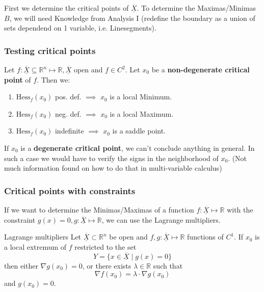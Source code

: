 \documentclass[a4paper,fontsize = 10pt]{article}
\def\R{\mathbb{R}}
\def\X{\underline{\overline{X}}}
\begin{document}
First we determine the critical points of \(\X\). To determine the Maximas/Minimas \(B\), we will need Knowledge from Analysis I (redefine the boundary as a union of sets dependend on 1 variable, i.e. Linesegments).
\subsubsection*{Testing critical points}
Let \(f: \X \subseteq \R^n \mapsto \R, \X\) open and \(f\in C^2\). Let \(x_0\) be a \textbf{non-degenerate critical point} of \(f\). Then we:
\begin{enumerate}
  \item $\text{Hess}_f(x_0)$ pos. def. \(\implies\) $x_0$ is a local Minimum.
  \item $\text{Hess}_f(x_0)$ neg. def. \(\implies\) $x_0$ is a local Maximum.
  \item $\text{Hess}_f(x_0)$ indefinite \(\implies\) $x_0$ is a saddle point.
\end{enumerate}
If \(x_0\) is a \textbf{degenerate critical point}, we can't conclude anything in general. In such a case we would have to verify the signs in the neighborhood of $x_0$. (Not much information found on how to do that in multi-variable calculus)
\subsubsection*{Critical points with constraints}
If we want to determine the Minimas/Maximas of a function \(f: \X \mapsto \R\) with the constraint \(g(x) = 0, g: \X \mapsto \R\), we can use the Lagrange multipliers.
\begin{subbox}{Lagrange multipliers}
  Let \(\X \subset \R^n\) be open and \(f,g: \X \mapsto \R\) functions of \(C^1\). If $x_0$ is a local extremum of $f$ restricted to the set \[Y = \{x \in \X \mid g(x) = 0\}\] then either $\nabla g(x_0) = 0$, or there exists $\lambda \in \R$ such that 
     \[\nabla f(x_0) = \lambda \cdot \nabla g(x_0)\] and \(g(x_0) = 0\).
\end{subbox}
\end{document}
